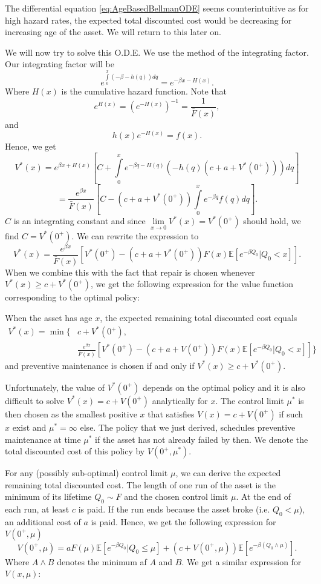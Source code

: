 \begin{remark}\label{remark:AgeBasedWeirdODE}
	The differential equation \eqref{eq:AgeBasedBellmanODE} seems counterintuitive as for high hazard rates, the expected total discounted cost would be decreasing for increasing age of the asset.
	We will return to this later on.
\end{remark}
We will now try to solve this O.D.E.
We use the method of the integrating factor.
Our integrating factor will be
$$
e^{\int\limits_0^x (-\beta - h(q))dq}=e^{-\beta x -H(x)}.
$$
Where $H(x)$ is the cumulative hazard function.
Note that
\[e^{H(x)}=(e^{-H(x)})^{-1}=\frac{1}{\bar F(x)},\]
and
\[h(x)e^{-H(x)}=f(x).\]
Hence, we get
$$
V^*(x)=e^{\beta x +H(x)} [C + \int\limits_0^x e^{-\beta q -H(q)}(-h(q)(c+a+V^*(0^+)))dq]
$$
$$
=\frac{e^{\beta x}}{\bar F(x)} [C - (c+a+V^*(0^+))\int\limits_0^x e^{-\beta q}f(q)dq].
$$
$C$ is an integrating constant and since $\lim\limits_{x\rightarrow 0}V^*(x)=V^*(0^+)$ should hold, we find $C=V^*(0^+)$.
We can rewrite the expression to
$$
V^*(x)=\frac{e^{\beta x}}{\bar F(x)} [V^*(0^+)  - (c+a+V^*(0^+))F(x)\mathbb{E}[e^{-\beta Q_0}|Q_0<x]].
$$
When we combine this with the fact that repair is chosen whenever $V^*(x)\geq c+V^*(0^+)$, we get the following expression for the value function corresponding to the optimal policy:
\begin{theorem}
	When the asset has age $x$, the expected remaining total discounted cost equals
	\begin{equation}\label{eq:AgeBasedSolvedBellman}
	\begin{split}
	V^*(x)=\min\{&c+V^*(0^+),\\
	&\frac{ e^{\beta x}}{\bar F(x)} [V^*(0^+) - (c+a+V(0^+))F(x)\mathbb{E}[e^{-\beta Q_0}|Q_0<x]]
	\}
	\end{split}
	\end{equation}
	and preventive maintenance is chosen if and only if $V^*(x)\geq c+V^*(0^+)$.
\end{theorem}
Unfortunately, the value of $V^*(0^+)$ depends on the optimal policy and it is also difficult to solve $V^*(x)=c+V(0^+)$ analytically for $x$.
The control limit $\mu^*$ is then chosen as the smallest positive $x$ that satisfies $V(x)=c+V(0^+)$ if such $x$ exist and $\mu^*=\infty$ else.
The policy that we just derived, schedules preventive maintenance at time $\mu^*$ if the asset has not already failed by then.
We denote the total discounted cost of this policy by $V(0^+,\mu^*)$.

For any (possibly sub-optimal) control limit $\mu$, we can derive the expected remaining total discounted cost.
The length of one run of the asset is the minimum of its lifetime $Q_0\sim F$ and the chosen control limit $\mu$.
At the end of each run, at least $c$ is paid.
If the run ends because the asset broke (i.e. $Q_0<\mu$), an additional cost of $a$ is paid.
Hence, we get the following expression for $V(0^+,\mu)$
\begin{equation}\label{eq:AgeBasedPolicyTDC}
V(0^+,\mu)=aF(\mu)\mathbb{E}[e^{-\beta Q_0}|Q_0\leq \mu]+(c+V(0^+,\mu))\mathbb{E}[e^{-\beta(Q_0\wedge\mu)}].
\end{equation}
Where $A\wedge B$ denotes the minimum af $A$ and $B$.
We get a similar expression for $V(x,\mu)$:

